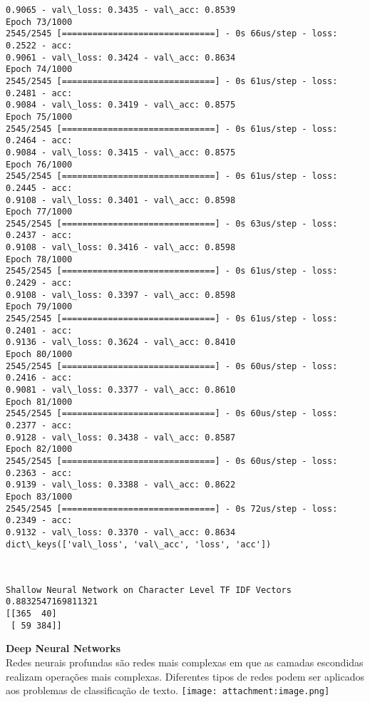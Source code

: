 \documentclass[11pt]{article}
\makeatletter
\def\maxwidth{\ifdim\Gin@nat@width>\linewidth\linewidth
    \else\Gin@nat@width\fi}
\let\Oldincludegraphics\includegraphics
\renewcommand{\includegraphics}[1]{\Oldincludegraphics[width=.8\maxwidth]{#1}}
\makeatother
\begin{document}
\begin{Verbatim}[commandchars=\\\{\}]
0.9065 - val\_loss: 0.3435 - val\_acc: 0.8539
Epoch 73/1000
2545/2545 [==============================] - 0s 66us/step - loss: 0.2522 - acc:
0.9061 - val\_loss: 0.3424 - val\_acc: 0.8634
Epoch 74/1000
2545/2545 [==============================] - 0s 61us/step - loss: 0.2481 - acc:
0.9084 - val\_loss: 0.3419 - val\_acc: 0.8575
Epoch 75/1000
2545/2545 [==============================] - 0s 61us/step - loss: 0.2464 - acc:
0.9084 - val\_loss: 0.3415 - val\_acc: 0.8575
Epoch 76/1000
2545/2545 [==============================] - 0s 61us/step - loss: 0.2445 - acc:
0.9108 - val\_loss: 0.3401 - val\_acc: 0.8598
Epoch 77/1000
2545/2545 [==============================] - 0s 63us/step - loss: 0.2437 - acc:
0.9108 - val\_loss: 0.3416 - val\_acc: 0.8598
Epoch 78/1000
2545/2545 [==============================] - 0s 61us/step - loss: 0.2429 - acc:
0.9108 - val\_loss: 0.3397 - val\_acc: 0.8598
Epoch 79/1000
2545/2545 [==============================] - 0s 61us/step - loss: 0.2401 - acc:
0.9136 - val\_loss: 0.3624 - val\_acc: 0.8410
Epoch 80/1000
2545/2545 [==============================] - 0s 60us/step - loss: 0.2416 - acc:
0.9081 - val\_loss: 0.3377 - val\_acc: 0.8610
Epoch 81/1000
2545/2545 [==============================] - 0s 60us/step - loss: 0.2377 - acc:
0.9128 - val\_loss: 0.3438 - val\_acc: 0.8587
Epoch 82/1000
2545/2545 [==============================] - 0s 60us/step - loss: 0.2363 - acc:
0.9139 - val\_loss: 0.3388 - val\_acc: 0.8622
Epoch 83/1000
2545/2545 [==============================] - 0s 72us/step - loss: 0.2349 - acc:
0.9132 - val\_loss: 0.3370 - val\_acc: 0.8634
dict\_keys(['val\_loss', 'val\_acc', 'loss', 'acc'])
\end{Verbatim}

    \begin{center}
    \end{center}
    { \hspace*{\fill} \\}
    
    \begin{Verbatim}[commandchars=\\\{\}]
Shallow Neural Network on Character Level TF IDF Vectors 0.8832547169811321
[[365  40]
 [ 59 384]]
\end{Verbatim}

    \textbf{Deep Neural Networks}\\
Redes neurais profundas são redes mais complexas em que as camadas
escondidas realizam operações mais complexas. Diferentes tipos de redes
podem ser aplicados aos problemas de classificação de texto.
\texttt{[image: attachment:image.png]}
\end{document}
